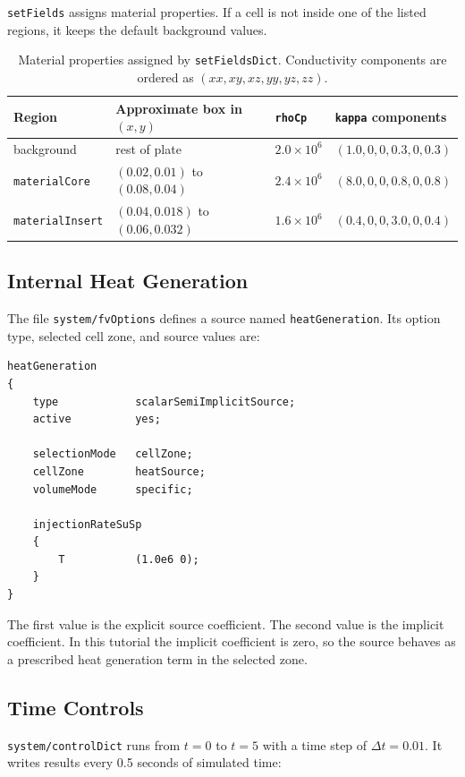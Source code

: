 \documentclass[11pt,a4paper]{article}
\newcommand{\code}[1]{\texttt{#1}}
\begin{document}
\code{setFields} assigns material properties. If a cell is not inside one of
the listed regions, it keeps the default background values.

\begin{table}[h]
\centering
\begin{tabularx}{\textwidth}{l l l Y}
\toprule
Region & Approximate box in $(x,y)$ & \code{rhoCp} & \code{kappa} components \\
\midrule
background & rest of plate & $2.0\times10^6$ &
$(1.0,0,0,0.3,0,0.3)$ \\
\code{materialCore} & $(0.02,0.01)$ to $(0.08,0.04)$ & $2.4\times10^6$ &
$(8.0,0,0,0.8,0,0.8)$ \\
\code{materialInsert} & $(0.04,0.018)$ to $(0.06,0.032)$ & $1.6\times10^6$ &
$(0.4,0,0,3.0,0,0.4)$ \\
\bottomrule
\end{tabularx}
\caption{Material properties assigned by \code{setFieldsDict}. Conductivity
components are ordered as $(xx,xy,xz,yy,yz,zz)$.}
\label{tab:material-regions}
\end{table}

\subsection{Internal Heat Generation}

The file \code{system/fvOptions} defines a source named \code{heatGeneration}.
Its option type, selected cell zone, and source values are:

\begin{lstlisting}
heatGeneration
{
    type            scalarSemiImplicitSource;
    active          yes;

    selectionMode   cellZone;
    cellZone        heatSource;
    volumeMode      specific;

    injectionRateSuSp
    {
        T           (1.0e6 0);
    }
}
\end{lstlisting}

The first value is the explicit source coefficient. The second value is the
implicit coefficient. In this tutorial the implicit coefficient is zero, so the
source behaves as a prescribed heat generation term in the selected zone.

\subsection{Time Controls}

\code{system/controlDict} runs from $t=0$ to $t=5$ with a time step of
$\Delta t=0.01$. It writes results every 0.5 seconds of simulated time:
\end{document}

